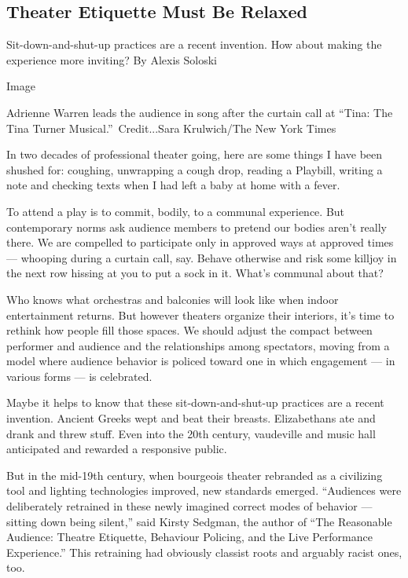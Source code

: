 \hypertarget{theater-etiquette-must-be-relaxed}{%
\subsection{Theater Etiquette Must Be
Relaxed}\label{theater-etiquette-must-be-relaxed}}

Sit-down-and-shut-up practices are a recent invention. How about making
the experience more inviting? By Alexis Soloski

Image

Adrienne Warren leads the audience in song after the curtain call at
``Tina: The Tina Turner Musical.''~Credit...Sara Krulwich/The New York
Times

In two decades of professional theater going, here are some things I
have been shushed for: coughing, unwrapping a cough drop, reading a
Playbill, writing a note and checking texts when I had left a baby at
home with a fever.

To attend a play is to commit, bodily, to a communal experience. But
contemporary norms ask audience members to pretend our bodies aren't
really there. We are compelled to participate only in approved ways at
approved times --- whooping during a curtain call, say. Behave otherwise
and risk some killjoy in the next row hissing at you to put a sock in
it. What's communal about that?

Who knows what orchestras and balconies will look like when indoor
entertainment returns. But however theaters organize their interiors,
it's time to rethink how people fill those spaces. We should adjust the
compact between performer and audience and the relationships among
spectators, moving from a model where audience behavior is policed
toward one in which engagement --- in various forms --- is celebrated.

Maybe it helps to know that these sit-down-and-shut-up practices are a
recent invention. Ancient Greeks wept and beat their breasts.
Elizabethans ate and drank and threw stuff. Even into the 20th century,
vaudeville and music hall anticipated and rewarded a responsive public.

But in the mid-19th century, when bourgeois theater rebranded as a
civilizing tool and lighting technologies improved, new standards
emerged. ``Audiences were deliberately retrained in these newly imagined
correct modes of behavior --- sitting down being silent,'' said Kirsty
Sedgman, the author of ``The Reasonable Audience: Theatre Etiquette,
Behaviour Policing, and the Live Performance Experience.'' This
retraining had obviously classist roots and arguably racist ones, too.

